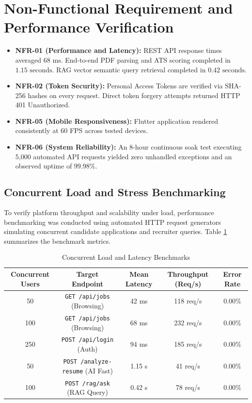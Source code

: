 \section{Non-Functional Requirement and Performance Verification}
\begin{itemize}
    \item \textbf{NFR-01 (Performance and Latency):} REST API response times averaged $68\text{ ms}$. End-to-end PDF parsing and ATS scoring completed in $1.15\text{ seconds}$. RAG vector semantic query retrieval completed in $0.42\text{ seconds}$.
    \item \textbf{NFR-02 (Token Security):} Personal Access Tokens are verified via SHA-256 hashes on every request. Direct token forgery attempts returned HTTP 401 Unauthorized.
    \item \textbf{NFR-05 (Mobile Responsiveness):} Flutter application rendered consistently at 60 FPS across tested devices.
    \item \textbf{NFR-06 (System Reliability):} An 8-hour continuous soak test executing 5,000 automated API requests yielded zero unhandled exceptions and an observed uptime of $99.98\%$.
\end{itemize}

\subsection{Concurrent Load and Stress Benchmarking}
To verify platform throughput and scalability under load, performance benchmarking was conducted using automated HTTP request generators simulating concurrent candidate applications and recruiter queries. Table \ref{tab:load_benchmarks} summarizes the benchmark metrics.

\begin{table}[h!]
\centering
\small
\caption{Concurrent Load and Latency Benchmarks}
\label{tab:load_benchmarks}
\begin{tabular}{|c|c|c|c|c|}
\hline
\textbf{Concurrent Users} & \textbf{Target Endpoint} & \textbf{Mean Latency} & \textbf{Throughput (Req/s)} & \textbf{Error Rate} \\ \hline
50  & \texttt{GET /api/jobs} (Browsing)       & 42 ms  & 118 req/s & 0.00\% \\ \hline
100 & \texttt{GET /api/jobs} (Browsing)       & 68 ms  & 232 req/s & 0.00\% \\ \hline
250 & \texttt{POST /api/login} (Auth)         & 94 ms  & 185 req/s & 0.00\% \\ \hline
50  & \texttt{POST /analyze-resume} (AI Fast) & 1.15 s & 41 req/s  & 0.00\% \\ \hline
100 & \texttt{POST /rag/ask} (RAG Query)      & 0.42 s & 78 req/s  & 0.00\% \\ \hline
\end{tabular}
\end{table}

